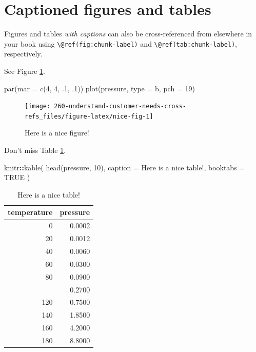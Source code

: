 \documentclass[
]{book}
\makeatletter
\newenvironment{Shaded}{\begin{snugshade}}{\end{snugshade}}
\newcommand{\AttributeTok}[1]{\textcolor[rgb]{0.13,0.29,0.53}{#1}}
\newcommand{\ConstantTok}[1]{\textcolor[rgb]{0.56,0.35,0.01}{#1}}
\newcommand{\DecValTok}[1]{\textcolor[rgb]{0.00,0.00,0.81}{#1}}
\newcommand{\FunctionTok}[1]{\textcolor[rgb]{0.13,0.29,0.53}{\textbf{#1}}}
\newcommand{\NormalTok}[1]{#1}
\newcommand{\SpecialCharTok}[1]{\textcolor[rgb]{0.81,0.36,0.00}{\textbf{#1}}}
\newcommand{\StringTok}[1]{\textcolor[rgb]{0.31,0.60,0.02}{#1}}
\newenvironment{kframe}{%
\medskip{}
\setlength{\fboxsep}{.8em}
 \def\at@end@of@kframe{}%
 \ifinner\ifhmode%
  \def\at@end@of@kframe{\end{minipage}}%
  \begin{minipage}{\columnwidth}%
 \fi\fi%
 \def\FrameCommand##1{\hskip\@totalleftmargin \hskip-\fboxsep
 \colorbox{shadecolor}{##1}\hskip-\fboxsep
     \hskip-\linewidth \hskip-\@totalleftmargin \hskip\columnwidth}%
 \MakeFramed {\advance\hsize-\width
   \@totalleftmargin\z@ \linewidth\hsize
   \@setminipage}}%
 {\par\unskip\endMakeFramed%
 \at@end@of@kframe}
\renewenvironment{Shaded}{\begin{kframe}}{\end{kframe}}
\renewcommand{\DecValTok}  [1]{\textcolor[rgb]{0.25,0.63,0.44}{{#1}}}
\renewcommand{\StringTok}  [1]{\textcolor[rgb]{0.25,0.44,0.63}{{#1}}}
\renewcommand{\FunctionTok}[1]{\textcolor[rgb]{0.02,0.16,0.49}{{#1}}}
\renewcommand{\NormalTok}  [1]{{#1}}
\makeatother
\begin{document}
\hypertarget{captioned-figures-and-tables}{%
\section{Captioned figures and tables}\label{captioned-figures-and-tables}}

Figures and tables \emph{with captions} can also be cross-referenced from elsewhere in your book using \texttt{\textbackslash{}@ref(fig:chunk-label)} and \texttt{\textbackslash{}@ref(tab:chunk-label)}, respectively.

See Figure \ref{fig:nice-fig}.

\begin{Shaded}
\begin{Highlighting}[]
\FunctionTok{par}\NormalTok{(}\AttributeTok{mar =} \FunctionTok{c}\NormalTok{(}\DecValTok{4}\NormalTok{, }\DecValTok{4}\NormalTok{, .}\DecValTok{1}\NormalTok{, .}\DecValTok{1}\NormalTok{))}
\FunctionTok{plot}\NormalTok{(pressure, }\AttributeTok{type =} \StringTok{\textquotesingle{}b\textquotesingle{}}\NormalTok{, }\AttributeTok{pch =} \DecValTok{19}\NormalTok{)}
\end{Highlighting}
\end{Shaded}

\begin{figure}

{\centering \texttt{[image: 260-understand-customer-needs-cross-refs\_files/figure-latex/nice-fig-1]} 

}

\caption{Here is a nice figure!}\label{fig:nice-fig}
\end{figure}

Don't miss Table \ref{tab:nice-tab}.

\begin{Shaded}
\begin{Highlighting}[]
\NormalTok{knitr}\SpecialCharTok{::}\FunctionTok{kable}\NormalTok{(}
  \FunctionTok{head}\NormalTok{(pressure, }\DecValTok{10}\NormalTok{), }\AttributeTok{caption =} \StringTok{\textquotesingle{}Here is a nice table!\textquotesingle{}}\NormalTok{,}
  \AttributeTok{booktabs =} \ConstantTok{TRUE}
\NormalTok{)}
\end{Highlighting}
\end{Shaded}

\begin{table}

\caption{\label{tab:nice-tab}Here is a nice table!}
\centering
\begin{tabular}[t]{rr}
\toprule
temperature & pressure\\
\midrule
0 & 0.0002\\
20 & 0.0012\\
40 & 0.0060\\
60 & 0.0300\\
80 & 0.0900\\
\addlinespace
100 & 0.2700\\
120 & 0.7500\\
140 & 1.8500\\
160 & 4.2000\\
180 & 8.8000\\
\bottomrule
\end{tabular}
\end{table}
\end{document}
